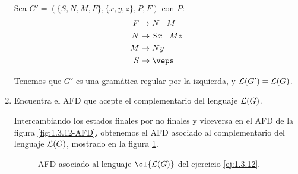 \begin{ejercicio}
\begin{enumerate}
        Sea $G'=(\{S,N,M, F\},\{x,y,z\},P,F)$ con $P$:
        \begin{align*}
            F & \rightarrow N\mid M\\
            N & \rightarrow Sx \mid Mz\\
            M & \rightarrow Ny\\
            S & \rightarrow \veps
        \end{align*}

        Tenemos que $G'$ es una gramática regular por la izquierda, y $\mathcal{L}(G')=\mathcal{L}(G)$.

        \item Encuentra el AFD que acepte el complementario del lenguaje $\mathcal{L}(G)$.
        
        Intercambiando los estados finales por no finales y viceversa en el AFD de la figura \ref{fig:1.3.12-AFD}, obtenemos el AFD asociado al complementario del lenguaje $\mathcal{L}(G)$, mostrado en la figura \ref{fig:1.3.12-AFD-Complementario}.
        \begin{figure}[H]
            \centering
            \caption{AFD asociado al lenguaje $\ol{\cc{L}(G)}$ del ejercicio \ref{ej:1.3.12}.}
            \label{fig:1.3.12-AFD-Complementario}
        \end{figure}
    \end{enumerate}
\end{ejercicio}

